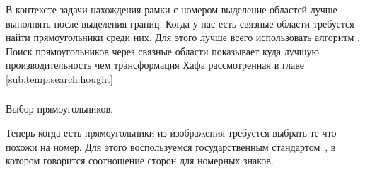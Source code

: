 В контексте задачи нахождения рамки с номером выделение областей лучше выполнять после выделения границ. Когда у нас есть связные области требуется найти прямоугольники среди них. Для этого лучше всего использовать алгоритм \minAreaRect{}. Поиск прямоугольников через связные области показывает куда лучшую производительность чем трансформация Хафа рассмотренная в главе \ref{sub:temp:search:hought}

\subsubsection{}
\label{sub:temp:search:selectrect}
Выбор прямоугольников.

Теперь когда есть прямоугольники из изображения требуется выбрать те что похожи на номер. Для этого воспользуемся государственным стандартом~\cite{stb_914_99}, в котором говорится соотношение сторон для номерных знаков.